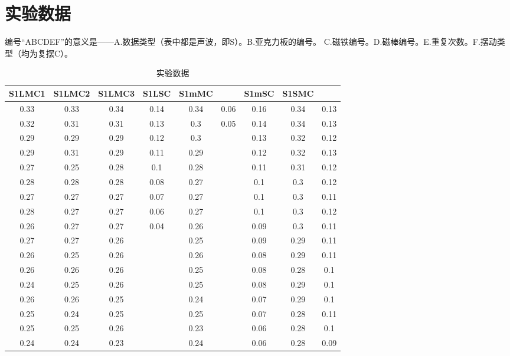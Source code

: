 \documentclass[AutoFakeBold]{LZUThesis}
\begin{document}
\section{实验数据}
\label{实验数据}
编号“ABCDEF”的意义是——A.数据类型（表中都是声波，即S）。B.亚克力板的编号。
C.磁铁编号。D.磁棒编号。E.重复次数。F.摆动类型（均为复摆C）。
\begin{longtable}{ccccccccc} %
    \caption{实验数据}\label{数据} \\
    \toprule
    S1LMC1 & S1LMC2 & S1LMC3 & S1LSC & S1mMC &      & S1mSC & S1SMC &      \\
    
    \midrule
    0.33   & 0.33   & 0.34   & 0.14  & 0.34  & 0.06 & 0.16  & 0.34  & 0.13 \\
0.32   & 0.31   & 0.31   & 0.13  & 0.3   & 0.05 & 0.14  & 0.34  & 0.13 \\
0.29   & 0.29   & 0.29   & 0.12  & 0.3   &      & 0.13  & 0.32  & 0.12 \\
0.29   & 0.31   & 0.29   & 0.11  & 0.29  &      & 0.12  & 0.32  & 0.13 \\
0.27   & 0.25   & 0.28   & 0.1   & 0.28  &      & 0.11  & 0.31  & 0.12 \\
0.28   & 0.28   & 0.28   & 0.08  & 0.27  &      & 0.1   & 0.3   & 0.12 \\
0.27   & 0.27   & 0.27   & 0.07  & 0.27  &      & 0.1   & 0.3   & 0.11 \\
0.28   & 0.27   & 0.27   & 0.06  & 0.27  &      & 0.1   & 0.3   & 0.12 \\
0.26   & 0.27   & 0.27   & 0.04  & 0.26  &      & 0.09  & 0.3   & 0.11 \\
0.27   & 0.27   & 0.26   &       & 0.25  &      & 0.09  & 0.29  & 0.11 \\
0.26   & 0.25   & 0.26   &       & 0.26  &      & 0.08  & 0.29  & 0.11 \\
0.26   & 0.26   & 0.26   &       & 0.25  &      & 0.08  & 0.28  & 0.1  \\
0.24   & 0.25   & 0.26   &       & 0.25  &      & 0.08  & 0.29  & 0.1  \\
0.26   & 0.26   & 0.25   &       & 0.24  &      & 0.07  & 0.29  & 0.1  \\
0.25   & 0.24   & 0.25   &       & 0.25  &      & 0.07  & 0.28  & 0.11 \\
0.25   & 0.25   & 0.26   &       & 0.23  &      & 0.06  & 0.28  & 0.1  \\
0.24   & 0.24   & 0.23   &       & 0.24  &      & 0.06  & 0.28  & 0.09 \\

\end{longtable}
\end{document}
